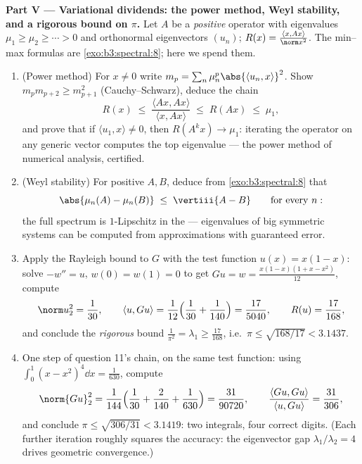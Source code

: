 \begin{problem}
\medskip
\noindent\textbf{Part V --- Variational dividends: the power
method, Weyl stability, and a rigorous bound on $\pi$.} Let
$A$ be a   \emph{positive} operator with
eigenvalues $\mu_1 \geq \mu_2 \geq \cdots > 0$ and
orthonormal eigenvectors $(u_n)$; $R(x) = \frac{\langle x,
Ax\rangle}{\norm x^2}$. The min--max formulas are
\cref{exo:b3:spectral:8}; here we spend them.
\begin{enumerate}[resume]
  \item (Power method) For $x \neq 0$ write $m_p =
        \sum_n\mu_n^p\abs{\langle u_n, x\rangle}^2$. Show
        $m_pm_{p+2} \geq m_{p+1}^2$ (Cauchy--Schwarz), deduce
        the chain
        \[
        R(x) \;\leq\; \frac{\langle Ax, Ax\rangle}{\langle x,
        Ax\rangle} \;\leq\; R(Ax) \;\leq\; \mu_1,
        \]
        and prove that if $\langle u_1, x\rangle \neq 0$,
        then $R(A^kx) \to \mu_1$: iterating the operator on
        any generic vector computes the top eigenvalue ---
        the power method of numerical analysis, certified.
  \item (Weyl stability) For   positive
        $A, B$, deduce from \cref{exo:b3:spectral:8} that
        \[
        \abs{\mu_n(A) - \mu_n(B)} \;\leq\; \vertiii{A - B}
        \qquad\text{for every } n :
        \]
        the full spectrum is $1$-Lipschitz in the  --- eigenvalues of big symmetric systems can be
        computed from approximations with guaranteed error.
  \item Apply the Rayleigh bound to $G$ with the test
        function $u(x) = x(1-x)$: solve $-w'' = u$, $w(0) =
        w(1) = 0$ to get $Gu = w = \frac{x(1-x)(1 + x -
        x^2)}{12}$, compute
        \[
        \norm u_2^2 = \frac1{30}, \qquad
        \langle u, Gu\rangle = \frac1{12}\Bigl(\frac1{30} +
        \frac1{140}\Bigr) = \frac{17}{5040},
        \qquad R(u) = \frac{17}{168},
        \]
        and conclude the \emph{rigorous} bound $\frac1{\pi^2}
        = \lambda_1 \geq \frac{17}{168}$, i.e.\ $\pi \leq
        \sqrt{168/17} < 3.1437$.
  \item One step of question 11's chain, on the same test
        function: using $\int_0^1(x - x^2)^4\dd x =
        \frac1{630}$, compute
        \[
        \norm{Gu}_2^2 = \frac1{144}\Bigl(\frac1{30} +
        \frac2{140} + \frac1{630}\Bigr) = \frac{31}{90720},
        \qquad
        \frac{\langle Gu, Gu\rangle}{\langle u, Gu\rangle} =
        \frac{31}{306},
        \]
        and conclude $\pi \leq \sqrt{306/31} < 3.1419$: two
        integrals, four correct digits. (Each further
        iteration roughly squares the accuracy: the
        eigenvector gap $\lambda_1/\lambda_2 = 4$ drives
        geometric convergence.)
\end{enumerate}


\end{problem}
